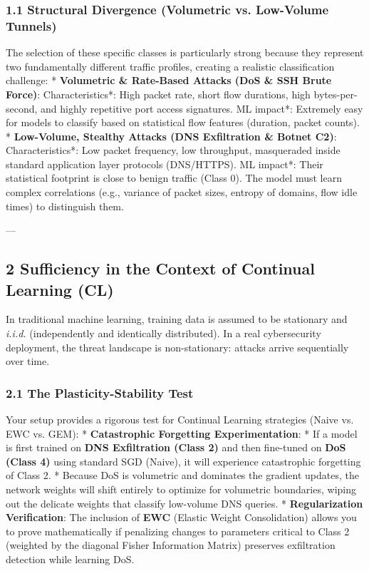 \documentclass[conference]{IEEEtran}
\begin{document}
\subsubsection{1.1 Structural Divergence (Volumetric vs. Low-Volume Tunnels)}
The selection of these specific classes is particularly strong because they represent two fundamentally different traffic profiles, creating a realistic classification challenge:
* \textbf{Volumetric \& Rate-Based Attacks (DoS \& SSH Brute Force)}:
  \textit{ }Characteristics*: High packet rate, short flow durations, high bytes-per-second, and highly repetitive port access signatures.
  \textit{ }ML impact*: Extremely easy for models to classify based on statistical flow features (duration, packet counts).
* \textbf{Low-Volume, Stealthy Attacks (DNS Exfiltration \& Botnet C2)}:
  \textit{ }Characteristics*: Low packet frequency, low throughput, masqueraded inside standard application layer protocols (DNS/HTTPS).
  \textit{ }ML impact*: Their statistical footprint is close to benign traffic (Class 0). The model must learn complex correlations (e.g., variance of packet sizes, entropy of domains, flow idle times) to distinguish them.

---


\subsection{2 Sufficiency in the Context of Continual Learning (CL)}

In traditional machine learning, training data is assumed to be stationary and \textit{i.i.d.} (independently and identically distributed). In a real cybersecurity deployment, the threat landscape is non-stationary: attacks arrive sequentially over time.


\subsubsection{2.1 The Plasticity-Stability Test}
Your setup provides a rigorous test for Continual Learning strategies (Naive vs. EWC vs. GEM):
* \textbf{Catastrophic Forgetting Experimentation}: 
  * If a model is first trained on \textbf{DNS Exfiltration (Class 2)} and then fine-tuned on \textbf{DoS (Class 4)} using standard SGD (Naive), it will experience catastrophic forgetting of Class 2.
  * Because DoS is volumetric and dominates the gradient updates, the network weights will shift entirely to optimize for volumetric boundaries, wiping out the delicate weights that classify low-volume DNS queries.
* \textbf{Regularization Verification}: The inclusion of \textbf{EWC} (Elastic Weight Consolidation) allows you to prove mathematically if penalizing changes to parameters critical to Class 2 (weighted by the diagonal Fisher Information Matrix) preserves exfiltration detection while learning DoS.
\end{document}
